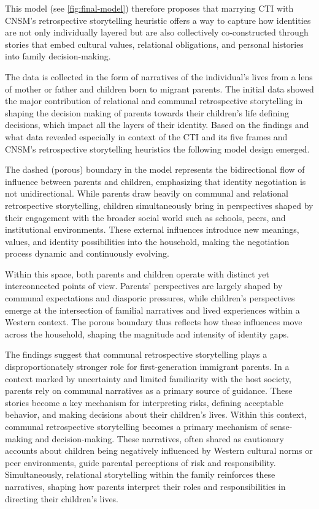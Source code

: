 This model (see \ref{fig:final-model}) therefore proposes that marrying CTI with CNSM’s retrospective storytelling heuristic offers a way to capture how identities are not only individually layered but are also collectively co-constructed through stories that embed cultural values, relational obligations, and personal histories into family decision-making.

The data is collected in the form of narratives of the individual’s lives from a lens of mother or father and children born to migrant parents. The initial data showed the major contribution of relational and communal retrospective storytelling in shaping the decision making of parents towards their children’s life defining decisions, which impact all the layers of their identity. Based on the findings and what data revealed especially in context of the CTI and its five frames and CNSM’s retrospective storytelling heuristics the following model design emerged. 

The dashed (porous) boundary in the model represents the bidirectional flow of influence between parents and children, emphasizing that identity negotiation is not unidirectional. While parents draw heavily on communal and relational retrospective storytelling, children simultaneously bring in perspectives shaped by their engagement with the broader social world such as schools, peers, and institutional environments. These external influences introduce new meanings, values, and identity possibilities into the household, making the negotiation process dynamic and continuously evolving.

Within this space, both parents and children operate with distinct yet interconnected points of view. Parents’ perspectives are largely shaped by communal expectations and diasporic pressures, while children’s perspectives emerge at the intersection of familial narratives and lived experiences within a Western context. The porous boundary thus reflects how these influences move across the household, shaping the magnitude and intensity of identity gaps.

 The findings suggest that communal retrospective storytelling plays a disproportionately stronger role for first-generation immigrant parents. In a context marked by uncertainty and limited familiarity with the host society, parents rely on communal narratives as a primary source of guidance. These stories become a key mechanism for interpreting risks, defining acceptable behavior, and making decisions about their children’s lives. Within this context, communal retrospective storytelling becomes a primary mechanism of sense-making and decision-making. These narratives, often shared as cautionary accounts about children being negatively influenced by Western cultural norms or peer environments, guide parental perceptions of risk and responsibility. Simultaneously, relational storytelling within the family reinforces these narratives, shaping how parents interpret their roles and responsibilities in directing their children’s lives.
 
